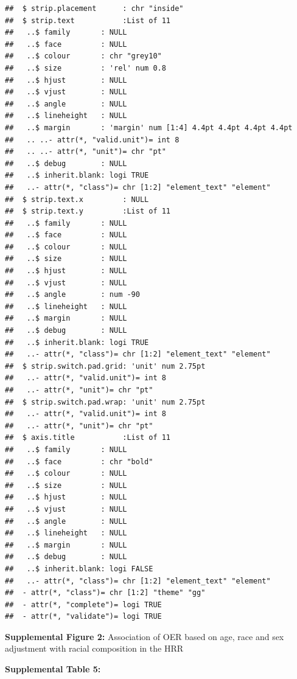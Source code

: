 \documentclass[]{article}
\begin{document}
\begin{verbatim}
##  $ strip.placement      : chr "inside"
##  $ strip.text           :List of 11
##   ..$ family       : NULL
##   ..$ face         : NULL
##   ..$ colour       : chr "grey10"
##   ..$ size         : 'rel' num 0.8
##   ..$ hjust        : NULL
##   ..$ vjust        : NULL
##   ..$ angle        : NULL
##   ..$ lineheight   : NULL
##   ..$ margin       : 'margin' num [1:4] 4.4pt 4.4pt 4.4pt 4.4pt
##   .. ..- attr(*, "valid.unit")= int 8
##   .. ..- attr(*, "unit")= chr "pt"
##   ..$ debug        : NULL
##   ..$ inherit.blank: logi TRUE
##   ..- attr(*, "class")= chr [1:2] "element_text" "element"
##  $ strip.text.x         : NULL
##  $ strip.text.y         :List of 11
##   ..$ family       : NULL
##   ..$ face         : NULL
##   ..$ colour       : NULL
##   ..$ size         : NULL
##   ..$ hjust        : NULL
##   ..$ vjust        : NULL
##   ..$ angle        : num -90
##   ..$ lineheight   : NULL
##   ..$ margin       : NULL
##   ..$ debug        : NULL
##   ..$ inherit.blank: logi TRUE
##   ..- attr(*, "class")= chr [1:2] "element_text" "element"
##  $ strip.switch.pad.grid: 'unit' num 2.75pt
##   ..- attr(*, "valid.unit")= int 8
##   ..- attr(*, "unit")= chr "pt"
##  $ strip.switch.pad.wrap: 'unit' num 2.75pt
##   ..- attr(*, "valid.unit")= int 8
##   ..- attr(*, "unit")= chr "pt"
##  $ axis.title           :List of 11
##   ..$ family       : NULL
##   ..$ face         : chr "bold"
##   ..$ colour       : NULL
##   ..$ size         : NULL
##   ..$ hjust        : NULL
##   ..$ vjust        : NULL
##   ..$ angle        : NULL
##   ..$ lineheight   : NULL
##   ..$ margin       : NULL
##   ..$ debug        : NULL
##   ..$ inherit.blank: logi FALSE
##   ..- attr(*, "class")= chr [1:2] "element_text" "element"
##  - attr(*, "class")= chr [1:2] "theme" "gg"
##  - attr(*, "complete")= logi TRUE
##  - attr(*, "validate")= logi TRUE
\end{verbatim}

\textbf{Supplemental Figure 2:} Association of OER based on age, race
and sex adjustment with racial composition in the HRR

\textbf{Supplemental Table 5:}
\end{document}
